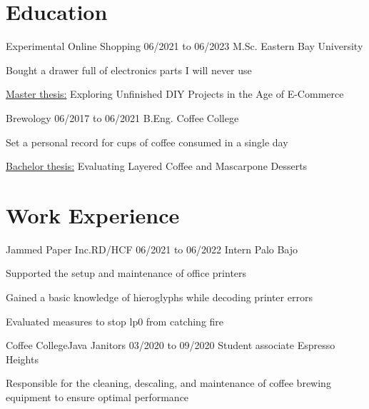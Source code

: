 %
%
%
%

\section{Education}
\begin{resumeList}  {Experimental Online Shopping}{}    {06/2021 to 06/2023}
                    {M.Sc.}                             {Eastern Bay University}
    \item Bought a drawer full of electronics parts I will never use
    \item \underline{Master thesis:} Exploring Unfinished DIY Projects in the Age of E-Commerce
\end{resumeList}
\begin{resumeList}  {Brewology}{}    {06/2017 to 06/2021}
                    {B.Eng.}         {Coffee College}
    \item Set a personal record for cups of coffee consumed in a single day
    \item \underline{Bachelor thesis:} Evaluating Layered Coffee and Mascarpone Desserts
\end{resumeList}


\section{Work Experience}
\begin{resumeList}  {Jammed Paper Inc.}{RD/HCF}    {06/2021 to 06/2022}
                    {Intern}                       {Palo Bajo}
    \item Supported the setup and maintenance of office printers
    \item Gained a basic knowledge of hieroglyphs while decoding printer errors
    \item Evaluated measures to stop lp0 from catching fire
\end{resumeList}
\begin{resumeList}  {Coffee College}{Java Janitors}    {03/2020 to 09/2020}
                    {Student associate}                {Espresso Heights}
    \item Responsible for the cleaning, descaling, and maintenance of coffee brewing equipment to ensure optimal performance
\end{resumeList}


